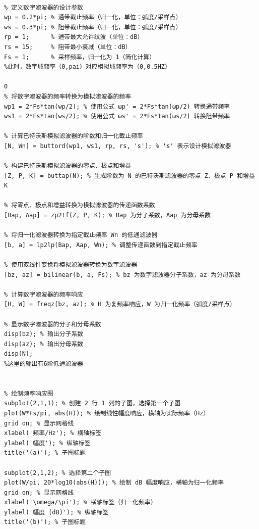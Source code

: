 \documentclass[12pt,hyperref,a4paper,UTF8]{ctexart}
\begin{document}
\begin{lstlisting}[style=matlab, caption={实验一MATLAB实现代码}]

% 定义数字滤波器的设计参数
wp = 0.2*pi; % 通带截止频率（归一化，单位：弧度/采样点）
ws = 0.3*pi; % 阻带截止频率（归一化，单位：弧度/采样点）
rp = 1;      % 通带最大允许纹波（单位：dB）
rs = 15;     % 阻带最小衰减（单位：dB）
Fs = 1;      % 采样频率，归一化为 1（简化计算）
%此时，数字域频率（0,pai）对应模拟域频率为（0,0.5HZ）

0
% 将数字滤波器的频率转换为模拟滤波器的频率
wp1 = 2*Fs*tan(wp/2); % 使用公式 ωp' = 2*Fs*tan(ωp/2) 转换通带频率
ws1 = 2*Fs*tan(ws/2); % 使用公式 ωs' = 2*Fs*tan(ωs/2) 转换阻带频率

% 计算巴特沃斯模拟滤波器的阶数和归一化截止频率
[N, Wn] = buttord(wp1, ws1, rp, rs, 's'); % 's' 表示设计模拟滤波器

% 构建巴特沃斯模拟滤波器的零点、极点和增益
[Z, P, K] = buttap(N); % 生成阶数为 N 的巴特沃斯滤波器的零点 Z、极点 P 和增益 K

% 将零点、极点和增益转换为模拟滤波器的传递函数系数
[Bap, Aap] = zp2tf(Z, P, K); % Bap 为分子系数，Aap 为分母系数

% 将归一化滤波器转换为指定截止频率 Wn 的低通滤波器
[b, a] = lp2lp(Bap, Aap, Wn); % 调整传递函数到指定截止频率

% 使用双线性变换将模拟滤波器转换为数字滤波器
[bz, az] = bilinear(b, a, Fs); % bz 为数字滤波器分子系数，az 为分母系数

% 计算数字滤波器的频率响应
[H, W] = freqz(bz, az); % H 为复频率响应，W 为归一化频率（弧度/采样点）

% 显示数字滤波器的分子和分母系数
disp(bz); % 输出分子系数
disp(az); % 输出分母系数
disp(N); 
%这里的输出有6阶低通滤波器


% 绘制频率响应图
subplot(2,1,1); % 创建 2 行 1 列的子图，选择第一个子图
plot(W*Fs/pi, abs(H)); % 绘制线性幅度响应，横轴为实际频率（Hz）
grid on; % 显示网格线
xlabel('频率/Hz'); % 横轴标签
ylabel('幅度'); % 纵轴标签
title('(a)'); % 子图标题

subplot(2,1,2); % 选择第二个子图
plot(W/pi, 20*log10(abs(H))); % 绘制 dB 幅度响应，横轴为归一化频率
grid on; % 显示网格线
xlabel('\omega/\pi'); % 横轴标签（归一化频率）
ylabel('幅度 (dB)'); % 纵轴标签
title('(b)'); % 子图标题

\end{lstlisting}
\end{document}
